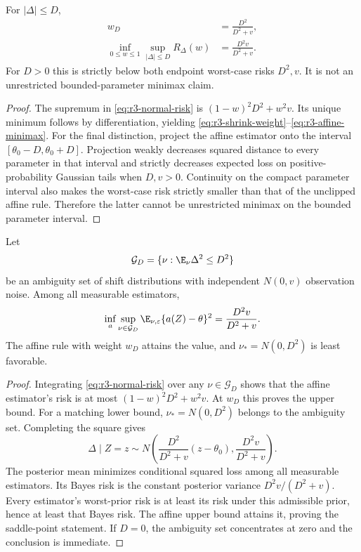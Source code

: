 \begin{theorem}
For $|\Delta|\leq D$,
\begin{align}
 w_D&=\frac{D^2}{D^2+v},\label{eq:r3-shrink-weight}\\
 \inf_{0\leq w\leq1}\sup_{|\Delta|\leq D}R_\Delta(w)
 &=\frac{D^2v}{D^2+v}.\label{eq:r3-affine-minimax}
\end{align}
For $D>0$ this is strictly below both endpoint worst-case risks $D^2,v$.
It is not an unrestricted bounded-parameter minimax claim.
\end{theorem}
\begin{proof}
The supremum in \eqref{eq:r3-normal-risk} is
$(1-w)^2D^2+w^2v$.  Its unique minimum follows by differentiation, yielding
\eqref{eq:r3-shrink-weight}--\eqref{eq:r3-affine-minimax}.
For the final distinction, project the affine estimator onto the interval
$[\theta_0-D,\theta_0+D]$.  Projection weakly decreases squared distance to
every parameter in that interval and strictly decreases expected loss
on positive-probability Gaussian tails when $D,v>0$.  Continuity on the
compact parameter interval also makes the worst-case risk strictly
smaller than that of the unclipped affine rule.  Therefore the latter
cannot be unrestricted minimax on the bounded parameter interval.
\end{proof}

\begin{theorem}
Let
\[
 \mathcal G_D=\{\nu:\E_\nu\Delta^2\leq D^2\}
\]
be an ambiguity set of shift distributions with independent
$N(0,v)$ observation noise.  Among all measurable estimators,
\begin{equation}
 \inf_a\sup_{\nu\in\mathcal G_D}
 \E_{\nu,\varepsilon}\{a(Z)-\theta\}^2
 =\frac{D^2v}{D^2+v}.
 \label{eq:r3-moment-minimax}
\end{equation}
The affine rule with weight $w_D$ attains the value, and
$\nu_*=N(0,D^2)$ is least favorable.
\end{theorem}
\begin{proof}
Integrating \eqref{eq:r3-normal-risk} over any $\nu\in\mathcal G_D$ shows
that the affine estimator's risk is at most
$(1-w)^2D^2+w^2v$.  At $w_D$ this proves the upper bound.
For a matching lower bound, $\nu_*=N(0,D^2)$ belongs to the ambiguity set.
Completing the square gives
\[
 \Delta\mid Z=z\sim N\left(
 \frac{D^2}{D^2+v}(z-\theta_0),\frac{D^2v}{D^2+v}\right).
\]
The posterior mean minimizes conditional squared loss among all
measurable estimators.  Its Bayes risk is the constant posterior variance
$D^2v/(D^2+v)$.  Every estimator's worst-prior risk is at least its risk
under this admissible prior, hence at least that Bayes risk.  The affine
upper bound attains it, proving the saddle-point statement.  If $D=0$,
the ambiguity set concentrates at zero and the conclusion is immediate.
\end{proof}

